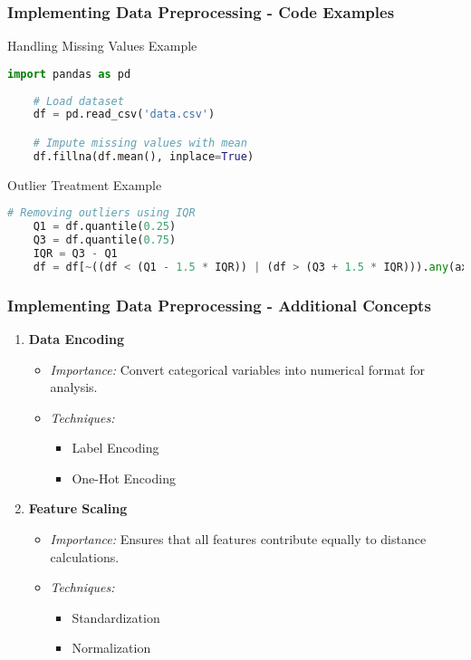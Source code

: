 \documentclass[aspectratio=169]{beamer}
\begin{document}
\begin{frame}[fragile]
    \frametitle{Implementing Data Preprocessing - Code Examples}
    \begin{block}{Handling Missing Values Example}
    \begin{lstlisting}[language=Python]
    import pandas as pd
    
    # Load dataset
    df = pd.read_csv('data.csv')

    # Impute missing values with mean
    df.fillna(df.mean(), inplace=True)
    \end{lstlisting}
    \end{block}

    \begin{block}{Outlier Treatment Example}
    \begin{lstlisting}[language=Python]
    # Removing outliers using IQR
    Q1 = df.quantile(0.25)
    Q3 = df.quantile(0.75)
    IQR = Q3 - Q1
    df = df[~((df < (Q1 - 1.5 * IQR)) | (df > (Q3 + 1.5 * IQR))).any(axis=1)]
    \end{lstlisting}
    \end{block}
\end{frame}

\begin{frame}
    \frametitle{Implementing Data Preprocessing - Additional Concepts}
    \begin{enumerate}
        \item \textbf{Data Encoding}
        \begin{itemize}
            \item \textit{Importance:} Convert categorical variables into numerical format for analysis.
            \item \textit{Techniques:}
            \begin{itemize}
                \item Label Encoding
                \item One-Hot Encoding
            \end{itemize}
        \end{itemize}

        \item \textbf{Feature Scaling}
        \begin{itemize}
            \item \textit{Importance:} Ensures that all features contribute equally to distance calculations.
            \item \textit{Techniques:}
            \begin{itemize}
                \item Standardization
                \item Normalization
            \end{itemize}
        \end{itemize}
    \end{enumerate}
\end{frame}
\end{document}
